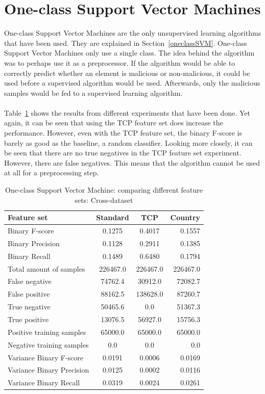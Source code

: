 \section{One-class Support Vector Machines}
\label{eval:oneclass}
One-class Support Vector Machines are the only unsupervised learning algorithms that have been used. They are explained in Section~\ref{oneclassSVM}. One-class Support Vector Machines only use a single class. The idea behind the algorithm was to perhaps use it as a preprocessor. If the algorithm would be able to correctly predict whether an element is malicious or non-malicious, it could be used before a supervised algorithm would be used. Afterwards, only the malicious samples would be fed to a supervised learning algorithm.\\
\\
Table~\ref{tab:one:cross} shows the results from different experiments that have been done. Yet again, it can be seen that using the TCP feature set does increase the performance. However, even with the TCP feature set, the binary F-score is barely as good as the baseline, a random classifier. Looking more closely, it can be seen that there are no true negatives in the TCP feature set experiment. However, there are false negatives. This means that the algorithm cannot be used at all for a preprocessing step.

\begin{table}[H]
\caption{One-class Support Vector Machine: comparing different feature sets: Cross-dataset}
\label{tab:one:cross}
\centering
\begin{tabular}{l c c r}
\toprule
Feature set & Standard & TCP & Country \\
\midrule
Binary F-score & 0.1275 & 0.4017 & 0.1557\\
Binary Precision & 0.1128 & 0.2911 & 0.1385 \\
Binary Recall & 0.1489 & 0.6480 & 0.1794\\
\midrule
Total amount of samples & 226467.0 & 226467.0 & 226467.0 \\
False negative & 74762.4 & 30912.0 & 72082.7 \\
False positive & 88162.5 & 138628.0 & 87260.7 \\
True negative & 50465.6 & 0.0 & 51367.3 \\
True positive & 13076.5 & 56927.0 & 15756.3 \\
\midrule
Positive training samples & 65000.0 & 65000.0 & 65000.0\\
Negative training samples & 0.0 & 0.0 & 0.0\\
\midrule
Variance Binary F-score & 0.0191 & 0.0006 & 0.0169 \\
Variance Binary Precision & 0.0125 &  0.0002 & 0.0116 \\
Variance Binary Recall & 0.0319 & 0.0024 & 0.0261 \\
\bottomrule
\end{tabular}
\end{table}
